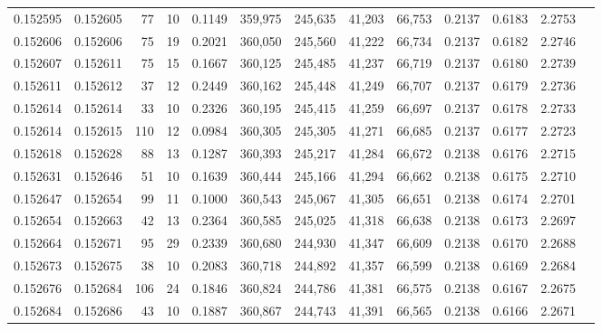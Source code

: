 \begin{tabular}{rrrrrrrrrrrrr}
0.152595 & 0.152605 &    77 &  10 &                                     0.1149 & 359,975 & 245,635 &  41,203 &  66,753 & 0.2137 & 0.6183 & 2.2753 \\
0.152606 & 0.152606 &    75 &  19 &                                     0.2021 & 360,050 & 245,560 &  41,222 &  66,734 & 0.2137 & 0.6182 & 2.2746 \\
0.152607 & 0.152611 &    75 &  15 &                                     0.1667 & 360,125 & 245,485 &  41,237 &  66,719 & 0.2137 & 0.6180 & 2.2739 \\
0.152611 & 0.152612 &    37 &  12 &                                     0.2449 & 360,162 & 245,448 &  41,249 &  66,707 & 0.2137 & 0.6179 & 2.2736 \\
0.152614 & 0.152614 &    33 &  10 &                                     0.2326 & 360,195 & 245,415 &  41,259 &  66,697 & 0.2137 & 0.6178 & 2.2733 \\
0.152614 & 0.152615 &   110 &  12 &                                     0.0984 & 360,305 & 245,305 &  41,271 &  66,685 & 0.2137 & 0.6177 & 2.2723 \\
0.152618 & 0.152628 &    88 &  13 &                                     0.1287 & 360,393 & 245,217 &  41,284 &  66,672 & 0.2138 & 0.6176 & 2.2715 \\
0.152631 & 0.152646 &    51 &  10 &                                     0.1639 & 360,444 & 245,166 &  41,294 &  66,662 & 0.2138 & 0.6175 & 2.2710 \\
0.152647 & 0.152654 &    99 &  11 &                                     0.1000 & 360,543 & 245,067 &  41,305 &  66,651 & 0.2138 & 0.6174 & 2.2701 \\
0.152654 & 0.152663 &    42 &  13 &                                     0.2364 & 360,585 & 245,025 &  41,318 &  66,638 & 0.2138 & 0.6173 & 2.2697 \\
0.152664 & 0.152671 &    95 &  29 &                                     0.2339 & 360,680 & 244,930 &  41,347 &  66,609 & 0.2138 & 0.6170 & 2.2688 \\
0.152673 & 0.152675 &    38 &  10 &                                     0.2083 & 360,718 & 244,892 &  41,357 &  66,599 & 0.2138 & 0.6169 & 2.2684 \\
0.152676 & 0.152684 &   106 &  24 &                                     0.1846 & 360,824 & 244,786 &  41,381 &  66,575 & 0.2138 & 0.6167 & 2.2675 \\
0.152684 & 0.152686 &    43 &  10 &                                     0.1887 & 360,867 & 244,743 &  41,391 &  66,565 & 0.2138 & 0.6166 & 2.2671 \\

\end{tabular}
